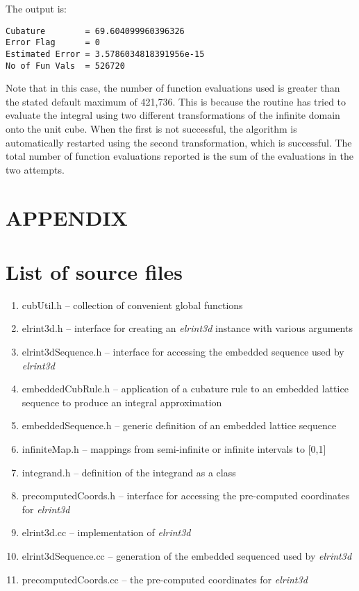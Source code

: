\documentclass[10pt]{article}
\def \algorithm {\textit{elrint3d} }
\def \algorithmNoSpace {\textit{elrint3d}}
\begin{document}
\noindent The output is:

\begin{verbatim}
Cubature        = 69.604099960396326
Error Flag      = 0
Estimated Error = 3.5786034818391956e-15
No of Fun Vals  = 526720
\end{verbatim}

Note that in this case, the number of function evaluations used is greater than the stated default maximum of 421,736.  This is because the routine has tried to evaluate the integral using two different transformations of the infinite domain onto the unit cube.  When the first is not successful, the algorithm is automatically restarted using the second transformation, which is successful.  The total number of function evaluations reported is the sum of the evaluations in the two attempts.

\appendix
\section*{APPENDIX}  %
\section{List of source files} \label{list_of_file}
\begin{enumerate}
\item cubUtil.h -- collection of convenient global functions
\item elrint3d.h  -- interface for creating an \algorithm instance with various arguments
\item elrint3dSequence.h  -- interface for accessing the embedded sequence used by \algorithmNoSpace
\item embeddedCubRule.h -- application of a cubature rule to an embedded lattice sequence to produce an integral approximation
\item embeddedSequence.h -- generic definition of an embedded lattice sequence
\item infiniteMap.h  -- mappings from semi-infinite or infinite intervals to [0,1]
\item integrand.h -- definition of the integrand as a class
\item precomputedCoords.h -- interface for accessing the pre-computed coordinates for \algorithmNoSpace
\item elrint3d.cc  -- implementation of \algorithmNoSpace
\item elrint3dSequence.cc -- generation of the embedded sequenced used by \algorithmNoSpace
\item precomputedCoords.cc -- the pre-computed coordinates for \algorithmNoSpace
\end{enumerate}
\end{document}
